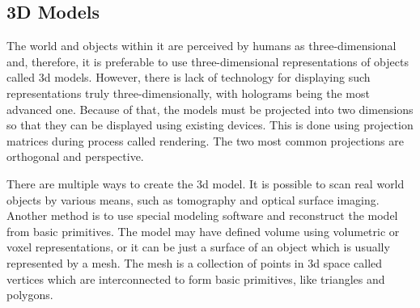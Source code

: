 \subsection{3D Models}
The world and objects within it are perceived by humans as three-dimensional
and, therefore, it is preferable to use three-dimensional representations of
objects called \gls{3d} models. However, there is lack of technology for displaying
such representations truly three-dimensionally, with holograms being the most
advanced one. Because of that, the models must be projected into two dimensions
so that they can be displayed using existing devices. This is done using
projection matrices during process called rendering. The two most common
projections are orthogonal and perspective.

There are multiple ways to create the \gls{3d} model. It is possible to scan real
world objects by various means, such as tomography and optical surface imaging.
Another method is to use special modeling software and reconstruct the model from basic
primitives. The model may have defined volume using volumetric or voxel
representations, or it can be just a surface of an object which is usually
represented by a mesh. The mesh is a collection of points in \gls{3d} space called vertices
which are interconnected to form basic primitives, like triangles and polygons.

